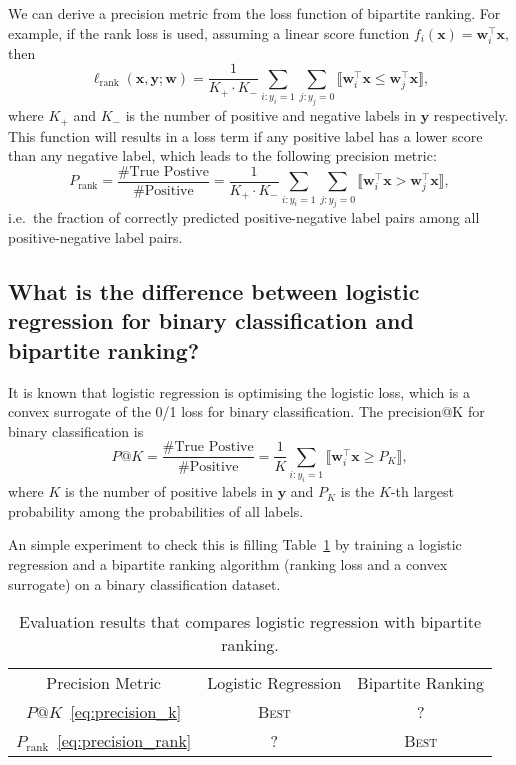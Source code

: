 \documentclass[9pt]{extarticle}
\newcommand{\llb}{\llbracket}
\newcommand{\rrb}{\rrbracket}
\newcommand{\x}{\mathbf{x}}
\newcommand{\y}{\mathbf{y}}
\newcommand{\1}{\mathbf{1}}
\newcommand{\w}{\mathbf{w}}
\newcommand{\ie}{i.e.\ }
\begin{document}
We can derive a precision metric from the loss function of bipartite ranking.
For example, if the rank loss is used, assuming a linear score function $f_i(\x) = \w_i^\top \x$, then
\begin{equation*}
\ell_\text{rank}(\x, \y; \w) = \frac{1}{K_+ \cdot K_-} \sum_{i:y_i=1} \sum_{j:y_j=0} \llb \w_i^\top\x \le \w_j^\top\x \rrb,
\end{equation*}
where $K_+$ and $K_-$ is the number of positive and negative labels in $\y$ respectively.
This function will results in a loss term if any positive label has a lower score than any negative label,
which leads to the following precision metric:
\begin{equation}
\label{eq:precision_rank}
P_\text{rank} = \frac{\text{\#True Postive}}{\text{\#Positive}} 
              = \frac{1}{K_+ \cdot K_-} \sum_{i:y_i=1} \sum_{j:y_j=0} \llb \w_i^\top\x > \w_j^\top\x \rrb,
\end{equation}
\ie the fraction of correctly predicted positive-negative label pairs among all positive-negative label pairs.


\subsection*{What is the difference between logistic regression for binary classification and bipartite ranking?}

It is known that logistic regression is optimising the logistic loss, which is a convex surrogate of the 0/1 loss for binary classification.
The precision@K for binary classification is 
\begin{equation}
\label{eq:precision_k}
P@K = \frac{\text{\#True Postive}}{\text{\#Positive}} 
    = \frac{1}{K} \sum_{i:y_i=1} \llb \w_i^\top \x \ge P_K \rrb,
\end{equation}
where $K$ is the number of positive labels in $\y$ and $P_K$ is the $K$-th largest probability among the probabilities of all labels.

An simple experiment to check this is filling Table~\ref{tab:precision} by training a logistic regression and a bipartite ranking algorithm (ranking loss and a convex surrogate) on a binary classification dataset.
\begin{table}[!h]
\centering
\begin{tabular}{c|cc} \hline \hline
Precision Metric                        & Logistic Regression & Bipartite Ranking \\
$P@K$~\ref{eq:precision_k}              & \textsc{Best}       & ?                 \\
$P_\text{rank}$~\ref{eq:precision_rank} & ?                   & \textsc{Best}     \\ \hline
\end{tabular}
\caption{Evaluation results that compares logistic regression with bipartite ranking.}
\label{tab:precision}
\end{table}
\end{document}
